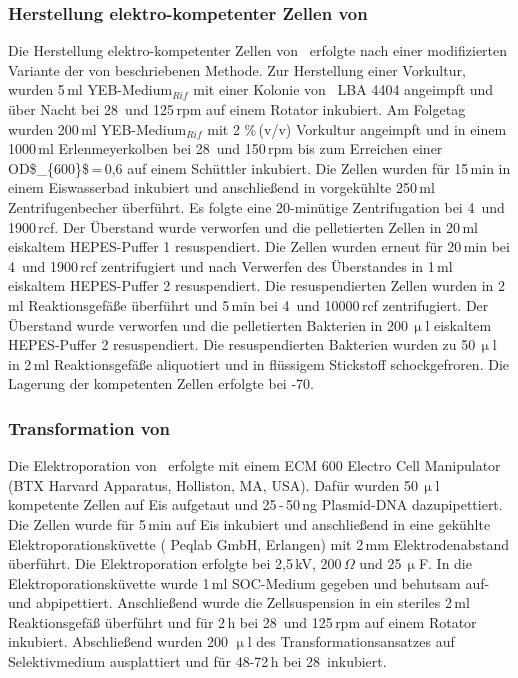 \subsubsection{Herstellung elektro-kompetenter Zellen von \Atumefaciens}
Die Herstellung elektro-kompetenter Zellen von \Atumefaciens\ erfolgte nach einer modifizierten Variante der von  \citet{Seidman.2001} beschriebenen Methode. 
Zur Herstellung einer Vorkultur, wurden 5\,ml YEB-Medium$_{Rif}$ mit einer Kolonie von \Atumefaciens\ LBA 4404 angeimpft und über Nacht bei 28\celcius\ und 125\,\acs{rpm} auf einem Rotator inkubiert. Am Folgetag wurden 200\,ml YEB-Medium$_{Rif}$ mit 2 \%\,(v/v) Vorkultur angeimpft und in einem 1000\,ml Erlenmeyerkolben bei 28\celcius\, und 150\,\acs{rpm}  bis zum Erreichen einer \acs{OD$_{600}$}\,=\,0,6 auf einem Schüttler inkubiert. Die Zellen wurden für 15\,min in einem Eiswasserbad inkubiert und anschließend in vorgekühlte 250\,ml Zentrifugenbecher überführt. Es folgte eine 20-minütige Zentrifugation bei 4\celcius\ und 1900\,\acs{rcf}. Der Überstand wurde verworfen und die pelletierten Zellen in 20\,ml eiskaltem HEPES-Puffer 1 resuspendiert. Die Zellen wurden erneut für 20\,min bei 4\celcius\ und 1900\,\acs{rcf} zentrifugiert und nach Verwerfen des Überstandes in 1\,ml eiskaltem HEPES-Puffer 2 resuspendiert. Die resuspendierten Zellen wurden in 2\,ml Reaktionsgefäße überführt und 5\,min bei 4\celcius\ und 10000\,\acs{rcf} zentrifugiert. Der Überstand wurde verworfen und die pelletierten Bakterien in 200\,$\upmu$l eiskaltem HEPES-Puffer 2 resuspendiert. Die resuspendierten Bakterien wurden zu 50\,$\upmu$l in 2\,ml Reaktionsgefäße aliquotiert und in flüssigem Stickstoff schockgefroren. Die Lagerung der kompetenten Zellen erfolgte bei -70\celcius.      
\subsubsection{Transformation von \Atumefaciens}
Die Elektroporation von \Atumefaciens\ erfolgte mit einem ECM 600 Electro Cell Manipulator (BTX Harvard Apparatus, Holliston, MA, USA). Dafür wurden 50\,$\upmu$l kompetente Zellen auf Eis aufgetaut und 25\,-\,50\,ng Plasmid-DNA dazupipettiert. Die Zellen wurde für 5\,min auf Eis inkubiert und anschließend in eine gekühlte Elektroporationsküvette ( Peqlab GmbH, Erlangen) mit 2\,mm Elektrodenabstand überführt. Die Elektroporation erfolgte bei 2,5\,kV, 200\,$\Omega$ und 25\,$\upmu$F. In die Elektroporationsküvette wurde 1\,ml SOC-Medium gegeben und behutsam auf- und abpipettiert. Anschließend wurde die Zellsuspension in ein steriles 2\,ml Reaktionsgefäß überführt und für 2\,h bei 28\celcius\ und 125\,rpm auf einem Rotator inkubiert. Abschließend wurden 200\,\,$\upmu$l des Transformationsansatzes auf Selektivmedium ausplattiert und für 48-72\,h bei 28\celcius\ inkubiert. 
